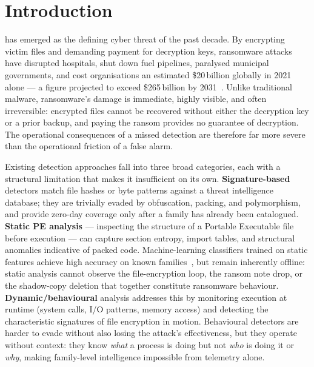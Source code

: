 \documentclass[journal]{IEEEtran}
\begin{document}
\section{Introduction}
\label{sec:intro}

 has emerged as the defining cyber threat of the
past decade.
By encrypting victim files and demanding payment for decryption keys,
ransomware attacks have disrupted hospitals, shut down fuel pipelines,
paralysed municipal governments, and cost organisations an estimated
\$20\,billion globally in 2021 alone --- a figure projected to exceed
\$265\,billion by 2031~\cite{cybersecurity_ventures_2022}.
Unlike traditional malware, ransomware's damage is immediate, highly visible,
and often irreversible: encrypted files cannot be recovered without either the
decryption key or a prior backup, and paying the ransom provides no guarantee
of decryption.
The operational consequences of a missed detection are therefore far more
severe than the operational friction of a false alarm.

Existing detection approaches fall into three broad categories, each with a
structural limitation that makes it insufficient on its own.
\textbf{Signature-based} detectors match file hashes or byte patterns against
a threat intelligence database; they are trivially evaded by obfuscation,
packing, and polymorphism, and provide zero-day coverage only after a family
has already been catalogued.
\textbf{Static PE analysis} --- inspecting the structure of a Portable
Executable file before execution --- can capture section entropy, import
tables, and structural anomalies indicative of packed code.
Machine-learning classifiers trained on static features achieve high accuracy
on known families~\cite{rdset_2021}, but remain inherently offline: static
analysis cannot observe the file-encryption loop, the ransom note drop, or the
shadow-copy deletion that together constitute ransomware behaviour.
\textbf{Dynamic/behavioural} analysis addresses this by monitoring execution
at runtime (system calls, I/O patterns, memory access) and detecting the
characteristic signatures of file encryption in motion.
Behavioural detectors are harder to evade without also losing the attack's
effectiveness, but they operate without context: they know \emph{what} a
process is doing but not \emph{who} is doing it or \emph{why}, making
family-level intelligence impossible from telemetry alone.
\end{document}
